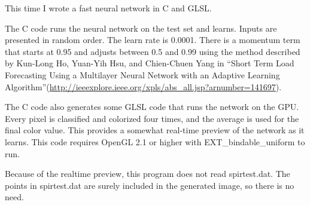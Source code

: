 \documentclass[11pt]{article}
\begin{document}
This time I wrote a fast neural network in C and GLSL.

The C code runs the neural network on the test set and learns. Inputs are presented in random order. The learn rate is 0.0001. There is a momentum term that starts at 0.95 and adjusts between 0.5 and 0.99 using the method described by Kun-Long Ho, Yuan-Yih Hsu, and Chien-Chuen Yang in ``Short Term Load Forecasting Using a Multilayer Neural Network with an Adaptive Learning Algorithm''(\url{http://ieeexplore.ieee.org/xpls/abs_all.jsp?arnumber=141697}).

The C code also generates some GLSL code that runs the network on the GPU. Every pixel is classified and colorized four times, and the average is used for the final color value. This provides a somewhat real-time preview of the network as it learns. This code requires OpenGL 2.1 or higher with EXT_bindable_uniform to run.

Because of the realtime preview, this program does not read spirtest.dat. The points in spirtest.dat are surely included in the generated image, so there is no need.
\end{document}
